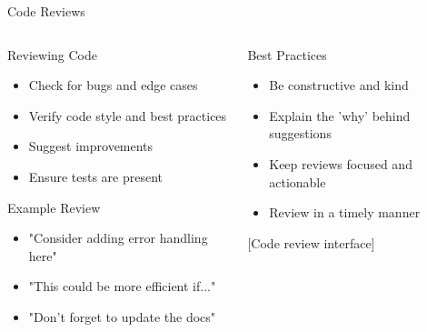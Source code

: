 \documentclass[aspectratio=169]{beamer}
\begin{document}
\begin{frame}{Code Reviews}
  \begin{columns}
    \begin{column}{0.48\textwidth}
      \begin{block}{Reviewing Code}
        \begin{itemize}
          \item Check for bugs and edge cases
          \item Verify code style and best practices
          \item Suggest improvements
          \item Ensure tests are present
        \end{itemize}
      \end{block}
      
      \begin{exampleblock}{Example Review}
        \begin{itemize}
          \item "Consider adding error handling here"
          \item "This could be more efficient if..."
          \item "Don't forget to update the docs"
        \end{itemize}
      \end{exampleblock}
    \end{column}
    
    \begin{column}{0.48\textwidth}
      \begin{block}{Best Practices}
        \begin{itemize}
          \item Be constructive and kind
          \item Explain the 'why' behind suggestions
          \item Keep reviews focused and actionable
          \item Review in a timely manner
        \end{itemize}
      \end{block}
      
      \begin{center}
        [Code review interface]
      \end{center}
    \end{column}
  \end{columns}
\end{frame}
\end{document}

